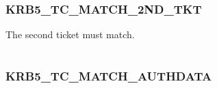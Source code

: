 \documentclass[letterpaper,10pt,english]{sphinxmanual}
\begin{document}
\begin{fulllineitems}
\label{appdev/refs/macros/KRB5_SAM_USE_SAD_AS_KEY:KRB5_SAM_USE_SAD_AS_KEY}
\end{fulllineitems}


\begin{tabulary}{\linewidth}{|L|L|}
\hline

 & 
\\\hline
\end{tabulary}



\subsubsection{KRB5\_TC\_MATCH\_2ND\_TKT}
\label{appdev/refs/macros/KRB5_TC_MATCH_2ND_TKT:krb5-tc-match-2nd-tkt-data}\label{appdev/refs/macros/KRB5_TC_MATCH_2ND_TKT::doc}\label{appdev/refs/macros/KRB5_TC_MATCH_2ND_TKT:krb5-tc-match-2nd-tkt}

\begin{fulllineitems}
\label{appdev/refs/macros/KRB5_TC_MATCH_2ND_TKT:KRB5_TC_MATCH_2ND_TKT}
\end{fulllineitems}


The second ticket must match.

\begin{tabulary}{\linewidth}{|L|L|}
\hline

 & 
\\\hline
\end{tabulary}



\subsubsection{KRB5\_TC\_MATCH\_AUTHDATA}
\label{appdev/refs/macros/KRB5_TC_MATCH_AUTHDATA::doc}\label{appdev/refs/macros/KRB5_TC_MATCH_AUTHDATA:krb5-tc-match-authdata-data}\label{appdev/refs/macros/KRB5_TC_MATCH_AUTHDATA:krb5-tc-match-authdata}

\begin{fulllineitems}
\label{appdev/refs/macros/KRB5_TC_MATCH_AUTHDATA:KRB5_TC_MATCH_AUTHDATA}
\end{fulllineitems}
\end{document}
